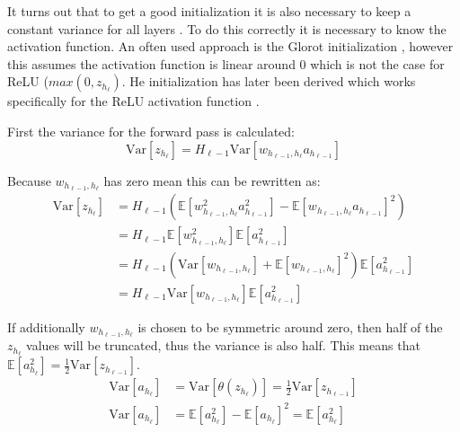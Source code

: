 It turns out that to get a good initialization it is also necessary to keep a constant variance for all layers \cite{glorot-initialization, he-initialization}. To do this correctly it is necessary to know the activation function. An often used approach is the Glorot initialization \cite{glorot-initialization}, however this assumes the activation function is linear around $0$ which is not the case for ReLU ($max(0, z_{h_{\ell}})$. He initialization has later been derived which works specifically for the ReLU activation function \cite{he-initialization}.

First the variance for the forward pass is calculated:
\begin{equation}
\mathrm{Var}[z_{h_\ell}] = H_{\ell-1} \mathrm{Var}[w_{h_{\ell-1}, h_{\ell}} a_{h_{\ell-1}}]
\end{equation}

Because $w_{h_{\ell-1}, h_{\ell}}$ has zero mean this can be rewritten as:
\begin{equation}
\begin{aligned}
\mathrm{Var}[z_{h_\ell}]
&= H_{\ell-1} \left( \mathbb{E}[w_{h_{\ell-1}, h_{\ell}}^2 a_{h_{\ell-1}}^2] - \mathbb{E}[w_{h_{\ell-1}, h_{\ell}} a_{h_{\ell-1}}]^2 \right) \\
&= H_{\ell-1} \mathbb{E}[w_{h_{\ell-1}, h_{\ell}}^2] \mathbb{E}[a_{h_{\ell-1}}^2] \\
&= H_{\ell-1} \left(\mathrm{Var}[w_{h_{\ell-1}, h_{\ell}}] + \mathbb{E}[w_{h_{\ell-1}, h_{\ell}}]^2\right) \mathbb{E}[a_{h_{\ell-1}}^2] \\
&= H_{\ell-1} \mathrm{Var}[w_{h_{\ell-1}, h_{\ell}}] \mathbb{E}[a_{h_{\ell-1}}^2]
\end{aligned}
\end{equation}

If additionally $w_{h_{\ell-1}, h_{\ell}}$ is chosen to be symmetric around zero, then half of the $z_{h_\ell}$ values will be truncated, thus the variance is also half. This means that $\mathbb{E}[a_{h_\ell}^2] = \frac{1}{2} \mathrm{Var}[z_{h_{\ell-1}}]$.
\begin{equation}
\begin{aligned}
\mathrm{Var}[a_{h_\ell}] &= \mathrm{Var}[\theta(z_{h_\ell})] = \frac{1}{2}\mathrm{Var}[z_{h_{\ell-1}}] \\
\mathrm{Var}[a_{h_\ell}] &= \mathbb{E}[a_{h_\ell}^2] -\mathbb{E}[a_{h_\ell}]^2 = \mathbb{E}[a_{h_\ell}^2]
\end{aligned}
\end{equation}

